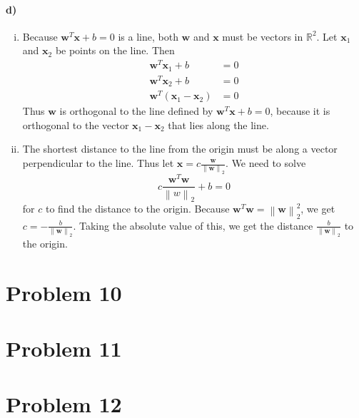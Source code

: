 \documentclass[12pt]{article}
\begin{document}
\paragraph{d)}

\begin{enumerate}[i)]
        \item Because \(\mathbf{w}^T\mathbf{x}+b=0\) is a line, both \(\mathbf{w}\) and \(\mathbf{x}\) must be vectors in \(\mathbb{R}^2\). Let \(\mathbf{x}_1\) and
                \(\mathbf{x}_2\) be points on the line. Then
                \begin{align*}
                        \mathbf{w}^T\mathbf{x}_1+b&=0\\
                        \mathbf{w}^T\mathbf{x}_2+b&=0\\
                        \mathbf{w}^T\left(\mathbf{x}_1-\mathbf{x}_2\right)&=0
                \end{align*}
                Thus \(\mathbf{w}\) is orthogonal to the line defined by \(\mathbf{w}^T\mathbf{x}+b=0\), because it is orthogonal to the vector \(\mathbf{x}_1-\mathbf{x}_2\) that
                lies along the line.
        \item The shortest distance to the line from the origin must be along a vector perpendicular to the line. Thus let
                \(\mathbf{x}=c\frac{\mathbf{w}}{\left\lVert \mathbf{w}\right\rVert_2}\). We need to solve
                \[c\frac{\mathbf{w}^T\mathbf{w}}{\left\lVert w\right\rVert_2}+b=0\]
                for \(c\) to find the distance to the origin. Because
                \(\mathbf{w}^T\mathbf{w}=\left\lVert \mathbf{w}\right\rVert_2^2\), we get \(c=-\frac{b}{\left\lVert \mathbf{w}\right\rVert_2}\).
                Taking the absolute value of this, we get the distance \(\frac{b}{\left\lVert \mathbf{w}\right\rVert_2}\) to the origin.
\end{enumerate}


\section*{Problem 10}
\section*{Problem 11}
\section*{Problem 12}
\end{document}
